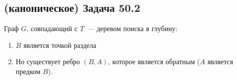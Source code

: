 \documentclass[a4paper]{article}
\begin{document}
\subsection*{(каноническое) Задача 50.2}
Граф $G$, совпадающий с $T$~--- деревом поиска в глубину:\newline
{}
\begin{enumerate}
\item $B$ является точкой раздела
\item Но существует ребро $(B,A)$, которое является обратным ($A$ является предком $B$).
\end{enumerate}
\end{document}
